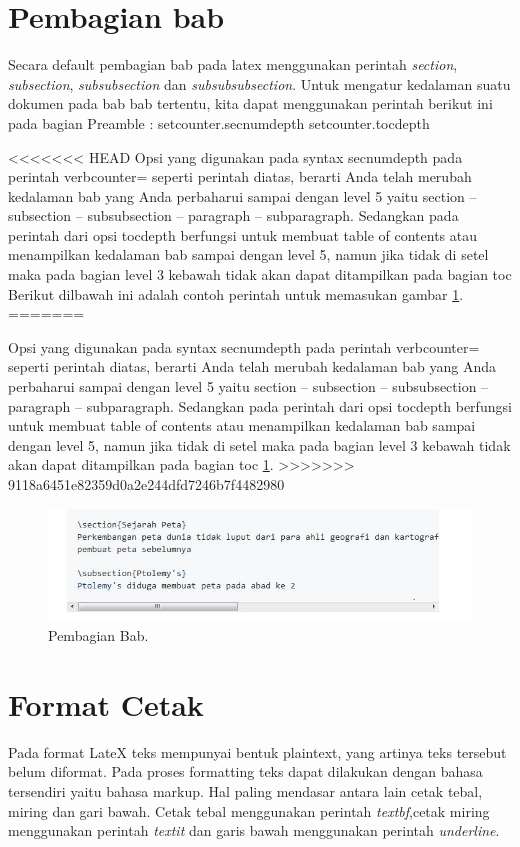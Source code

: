 \section{Pembagian bab}
Secara default pembagian bab pada latex menggunakan perintah \textit{section}, \textit{subsection}, \textit{subsubsection} dan \textit{subsubsubsection}. Untuk mengatur kedalaman suatu dokumen pada bab bab tertentu, kita dapat menggunakan perintah berikut ini pada bagian Preamble :
setcounter.secnumdepth
setcounter.tocdepth

<<<<<<< HEAD
Opsi yang digunakan pada syntax secnumdepth pada perintah verbcounter= seperti perintah diatas, berarti Anda telah merubah kedalaman bab yang Anda perbaharui sampai dengan level 5 yaitu section -- subsection -- subsubsection -- paragraph -- subparagraph. Sedangkan pada perintah dari opsi tocdepth berfungsi untuk membuat table of contents atau menampilkan kedalaman bab sampai dengan level 5, namun jika tidak di setel maka pada bagian level 3 kebawah tidak akan dapat ditampilkan pada bagian toc 
Berikut dilbawah ini adalah contoh perintah untuk memasukan gambar \ref{labelgambar}.
=======

Opsi yang digunakan pada syntax secnumdepth pada perintah verbcounter= seperti perintah diatas, berarti Anda telah merubah kedalaman bab yang Anda perbaharui sampai dengan level 5 yaitu section -- subsection -- subsubsection -- paragraph -- subparagraph. Sedangkan pada perintah dari opsi tocdepth berfungsi untuk membuat table of contents atau menampilkan kedalaman bab sampai dengan level 5, namun jika tidak di setel maka pada bagian level 3 kebawah tidak akan dapat ditampilkan pada bagian toc \ref{labelgambar}.
>>>>>>> 9118a6451e82359d0a2e244dfd7246b7f4482980
\begin{figure}[ht]
\centerline{\includegraphics[width=1\textwidth]{figures/capture.JPG}}
\caption{Pembagian Bab.}
\label{labelgambar}
\end{figure}



\section{Format Cetak}
Pada format LateX teks mempunyai bentuk plaintext, yang artinya teks tersebut belum diformat. Pada proses formatting teks dapat dilakukan dengan bahasa tersendiri yaitu bahasa markup. Hal paling mendasar antara lain cetak tebal, miring dan gari bawah. Cetak tebal menggunakan perintah \textit{textbf},cetak miring menggunakan perintah \textit{textit} dan garis bawah menggunakan perintah \textit{underline}.

